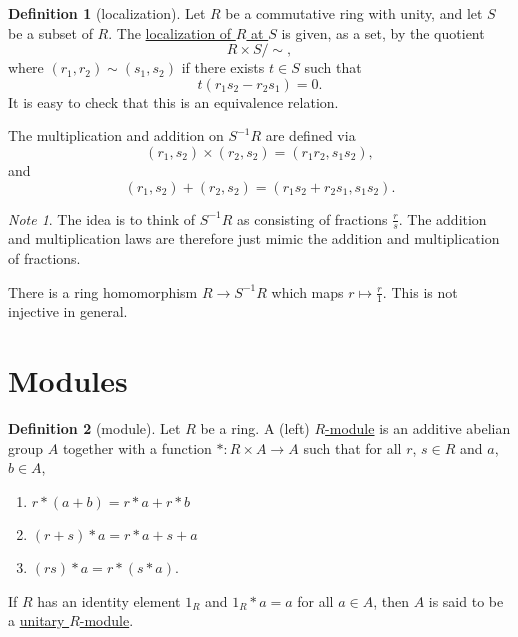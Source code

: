 \documentclass[a4paper,10pt]{scrreprt}
\newcommand{\defn}[1]{\ul{#1}}
\theoremstyle{definition}
\newtheorem{definition}{Definition}[section]
\theoremstyle{plain}
\theoremstyle{remark}
\newtheorem{note}{Note}[section]
\begin{document}
\begin{definition}[localization]
  \label{def:localizationofaring}
  Let $R$ be a commutative ring with unity, and let $S$ be a subset of $R$. The \defn{localization of $R$ at $S$} is given, as a set, by the quotient 
  \begin{equation*}
    R \times S / \sim,
  \end{equation*}
  where $(r_{1}, r_{2}) \sim (s_{1}, s_{2})$ if there exists $t \in S$ such that 
  \begin{equation*}
    t(r_{1} s_{2} - r_{2} s_{1}) = 0.
  \end{equation*}
  It is easy to check that this is an equivalence relation.

  The multiplication and addition on $S^{-1}R$ are defined via
  \begin{equation*}
    (r_{1}, s_{2}) \times (r_{2}, s_{2}) = (r_{1}r_{2}, s_{1}s_{2}),
  \end{equation*}
  and
  \begin{equation*}
    (r_{1}, s_{2}) + (r_{2}, s_{2}) = (r_{1}s_{2} + r_{2}s_{1}, s_{1}s_{2}).
  \end{equation*}
\end{definition}

\begin{note}
  The idea is to think of $S^{-1}R$ as consisting of fractions $\frac{r}{s}$. The addition and multiplication laws are therefore just mimic the addition and multiplication of fractions.

  There is a ring homomorphism $R \to S^{-1}R$ which maps $r \mapsto \frac{r}{1}$. This is not injective in general.
\end{note}

\section{Modules}
\begin{definition}[module]
  \label{def:module}
  Let $R$ be a ring. A (left) \defn{$R$-module} is an additive abelian group $A$ together with a function $*\colon R \times A \to A$ such that for all $r$, $s \in R$ and $a$, $b \in A$,
  \begin{enumerate}
    \item $r*(a+b) = r*a + r*b$
    \item $(r+s)*a = r*a + s+a$
    \item $(rs)*a = r*(s*a)$.
  \end{enumerate}
  If $R$ has an identity element $1_{R}$ and $1_{R}*a = a$ for all $a \in A$, then $A$ is said to be a \defn{unitary $R$-module}.
\end{definition}
\end{document}
